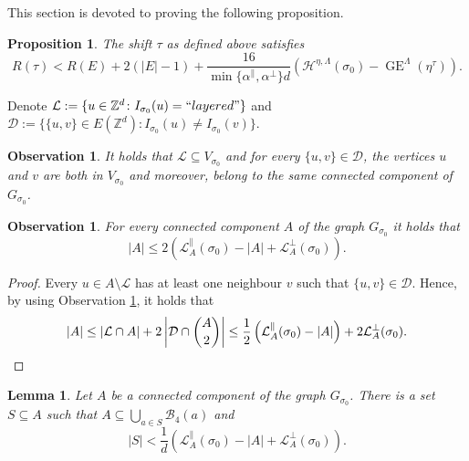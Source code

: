 \documentclass[11pt, reqno]{amsart}
\newtheorem{lemma}[theorem]{Lemma}
\newtheorem{proposition}[theorem]{Proposition}
\newtheorem{obs}[theorem]{Observation}
\DeclareMathOperator{\GE}{GE}
\numberwithin{equation}{section}
\begin{document}
This section is devoted to proving the following proposition.

\begin{proposition}\label{prop:R_s}
The shift ${\tau}$ as defined above satisfies
$$
R({\tau})< R(E)+2(\lvert E\rvert-1)+\frac{16}{\min\{\alpha^{\parallel},\alpha^{\perp}\}d}\left(\mathcal{H}^{\eta,\Lambda}(\sigma_0) -\GE^{\Lambda}(\eta^{\tau})\right).
$$    
\end{proposition}

Denote 
${\mathcal L}:=\{u\in{\mathbb Z}^d\colon I_{\sigma_0}(u)={\rm ``layered"}\}$ and
${\mathcal D}:=\{\{u,v\}\in E({\mathbb Z}^d)\colon I_{\sigma_0}(u)\neq I_{\sigma_0}(v)\}$.

\begin{obs}\label{obs:LD}
It holds that ${\mathcal L}\subseteq V_{\sigma_0}$ and for every $\{u,v\}\in{\mathcal D}$, the vertices $u$ and $v$ are both in $V_{\sigma_0}$ and moreover, belong to the same connected component of $G_{\sigma_0}$.
\end{obs}

\begin{obs}\label{obs:CLD}
For every connected component $A$ of the graph $G_{\sigma_0}$ it holds that
$$\lvert A\rvert\leq 2\left(\mathcal{L}^{\parallel}_A(\sigma_0)-|A|+\mathcal{L}^{\perp}_A(\sigma_0)\right).$$
\end{obs}

\begin{proof}
Every $u\in A\setminus{\mathcal L}$ has at least one neighbour $v$ such that $\{u,v\}\in{\mathcal D}$. Hence, by using Observation \ref{obs:LD}, it holds that
\begin{equation*}
\lvert A\rvert\leq \lvert {\mathcal L}\cap A\rvert+2\left\lvert {\mathcal D}\cap\binom{A}{2} \right\rvert
\leq \frac{1}{2}\left(\mathcal{L}^{\parallel}_A(\sigma_0)-|A|\right)+2\mathcal{L}^{\perp}_A(\sigma_0). \qedhere\end{equation*}
\end{proof}

\begin{lemma}\label{lem:net0}
Let $A$ be a connected component of the graph $G_{\sigma_0}$.
There is a set $S\subseteq A$ such that 
$A\subseteq\bigcup_{a\in S}{\mathcal B}_4(a)$ and
$$\lvert S\rvert<\frac{1}{d}\left(\mathcal{L}^{\parallel}_A(\sigma_0)-|A|+\mathcal{L}^{\perp}_A(\sigma_0)\right).$$
\end{lemma}
\end{document}
